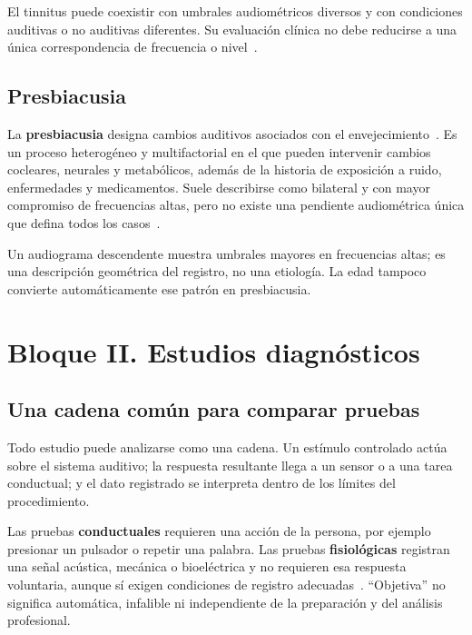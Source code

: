El tinnitus puede coexistir con umbrales audiométricos diversos y con
condiciones auditivas o no auditivas diferentes. Su evaluación clínica no
debe reducirse a una única correspondencia de frecuencia o nivel~\cite{ashaTinnitus}.

\subsection{Presbiacusia}
\label{sec:u8-presbiacusia}

La \textbf{presbiacusia} designa cambios auditivos asociados con el
envejecimiento~\cite{gatesMills2005}. Es un proceso heterogéneo y multifactorial en el que
pueden intervenir cambios cocleares, neurales y metabólicos, además de la
historia de exposición a ruido, enfermedades y medicamentos. Suele
describirse como bilateral y con mayor compromiso de frecuencias altas, pero
no existe una pendiente audiométrica única que defina todos los casos~\cite{gatesMills2005}.

Un audiograma descendente muestra umbrales mayores en frecuencias altas; es
una descripción geométrica del registro, no una etiología. La edad tampoco
convierte automáticamente ese patrón en presbiacusia.

\section{Bloque II. Estudios diagnósticos}
\label{sec:u8-estudios}

\subsection{Una cadena común para comparar pruebas}
\label{sec:u8-cadena-medicion}

Todo estudio puede analizarse como una cadena. Un estímulo controlado actúa
sobre el sistema auditivo; la respuesta resultante llega a un sensor o a una
tarea conductual; y el dato registrado se interpreta dentro de los límites
del procedimiento.

Las pruebas \textbf{conductuales} requieren una acción de la persona,
por ejemplo presionar un pulsador o repetir una palabra. Las pruebas
\textbf{fisiológicas} registran una señal acústica, mecánica o bioeléctrica y
no requieren esa respuesta voluntaria, aunque sí exigen condiciones de
registro adecuadas~\cite{ashaHearingAdults}. ``Objetiva'' no significa automática, infalible ni
independiente de la preparación y del análisis profesional.

